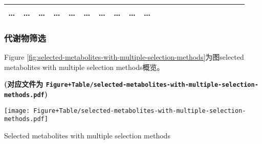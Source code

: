 \documentclass[
]{article}
\begin{document}
\begin{longtable}[]{@{}lllllllllllllllllllll@{}}
\begin{minipage}[t]{0.03\columnwidth}
\ldots{}\strut
\end{minipage} & \begin{minipage}[t]{0.03\columnwidth}\raggedright
\ldots{}\strut
\end{minipage} & \begin{minipage}[t]{0.03\columnwidth}\raggedright
\ldots{}\strut
\end{minipage} & \begin{minipage}[t]{0.03\columnwidth}\raggedright
\ldots{}\strut
\end{minipage} & \begin{minipage}[t]{0.03\columnwidth}\raggedright
\ldots{}\strut
\end{minipage} & \begin{minipage}[t]{0.03\columnwidth}\raggedright
\ldots{}\strut
\end{minipage} & \begin{minipage}[t]{0.03\columnwidth}\raggedright
\ldots{}\strut
\end{minipage} & \begin{minipage}[t]{0.03\columnwidth}\raggedright
\ldots{}\strut
\end{minipage} & \begin{minipage}[t]{0.03\columnwidth}\raggedright
\ldots{}\strut
\end{minipage} & \begin{minipage}[t]{0.01\columnwidth}\raggedright
\ldots{}\strut
\end{minipage}\tabularnewline
\bottomrule
\end{longtable}

\hypertarget{ux4ee3ux8c22ux7269ux7b5bux9009}{%
\subsubsection{代谢物筛选}\label{ux4ee3ux8c22ux7269ux7b5bux9009}}

Figure \ref{fig:selected-metabolites-with-multiple-selection-methods}为图selected metabolites with multiple selection methods概览。

\textbf{(对应文件为 \texttt{Figure+Table/selected-metabolites-with-multiple-selection-methods.pdf})}

\def\@captype{figure}
\begin{center}
\texttt{[image: Figure+Table/selected-metabolites-with-multiple-selection-methods.pdf]}
\caption{Selected metabolites with multiple selection methods}\label{fig:selected-metabolites-with-multiple-selection-methods}
\end{center}
\end{document}
